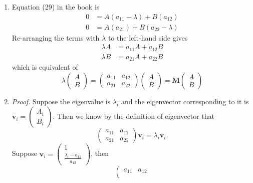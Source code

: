 \documentclass[
    classnum=MATH564,
    classname=MATHEMATICAL\ MODELING,
    due=January\ 28\,\ 2020,
    author=Gabrielle\ Streeter\qquad Hannah\ Wu\qquad\ Minghang\ Li,
    authorshort=Streeter\ \&\ Wu\ \&\ Li,
    teacher= Zachary\ M.\ Boyd,
    hw=1
]{hw-template}
\begin{document}
\begin{homeworkProblem}
\solution
\begin{enumerate}
    \item Equation (29) in the book is \[
        \begin{aligned}
            0 &= A(a_{11} - \lambda) + B(a_{12})\\
            0 &= A(a_{21}) + B(a_{22} - \lambda)
        \end{aligned}
    \]
    Re-arranging the terms with $\lambda$ to the left-hand side gives\[
        \begin{aligned}
            \lambda A &= a_{11} A + a_{12} B\\
            \lambda B &= a_{21} A + a_{22} B
        \end{aligned}
    \]
    which is equivalent of \[
        \lambda \left(\begin{matrix}
            A\\B
        \end{matrix}\right) = \left(\begin{matrix}
            a_{11} & a_{12}\\
            a_{21} & a_{22}
        \end{matrix}\right) \left(\begin{matrix}
            A\\B
        \end{matrix}\right) = \mathbf{M} \left(\begin{matrix}
            A\\B
        \end{matrix}\right)
    \]
    \item \textit{Proof}. Suppose the eigenvalue is $\lambda_i$ and the eigenvector corresponding
    to it is $\mathbf{v}_i = \left(\begin{matrix}A_i\\B_i\end{matrix}\right)$. Then we know by the definition of eigenvector that \[
        \left(\begin{matrix}
            a_{11} & a_{12}\\
            a_{21} & a_{22}
        \end{matrix}\right) \mathbf{v}_i = \lambda_i \mathbf{v}_i.
    \]
    Suppose $\mathbf{v}_i = \left(\begin{matrix}1\\ \frac{\lambda_i - a_{11}}{a_{12}}\end{matrix}\right)$, then\[
        \left(\begin{matrix}
            a_{11} & a_{12}\\

\end{matrix}\]
\end{enumerate}
\end{homeworkProblem}
\end{document}
